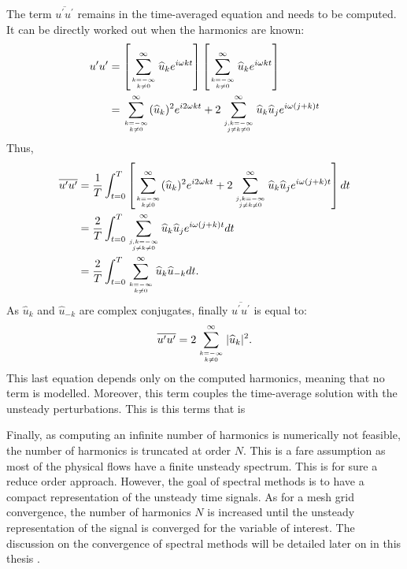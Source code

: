 The term $\overline{u^\prime u^\prime}$ remains in the time-averaged
equation and needs to be computed. It can be 
directly worked out when the harmonics are known:
\begin{equation}
	\begin{split}
		u^\prime u^\prime &= 
		\left[
			\sum_{k=-\infty \atop k \neq 0}^{\infty} \widehat{u}_k e^{i \omega k t} 
		\right]
		\left[
			\sum_{k=-\infty \atop k \neq 0}^{\infty} \widehat{u}_k e^{i \omega k t} 
		\right] \\
		&= \sum_{k=-\infty \atop k \neq 0}^{\infty} (\widehat{u}_k)^2
		   e^{i 2 \omega k t} +
		   2 \sum_{j,k=-\infty \atop j \neq k \neq 0}^{\infty} 
		   \widehat{u}_k \widehat{u}_j e^{i \omega (j + k) t} \\
	\end{split}
\end{equation}
Thus,
\begin{equation}
	\begin{split}
		\overline{u^\prime u^\prime} &= 
		\frac{1}{T} \int_{t=0}^{T} \left[ 
			\sum_{k=-\infty \atop k \neq 0}^{\infty} (\widehat{u}_k)^2
		   	e^{i 2 \omega k t} +
		   	2 \sum_{j,k=-\infty \atop j \neq k \neq 0}^{\infty} 
		   	\widehat{u}_k \widehat{u}_j e^{i \omega (j + k) t} 
		\right] dt\\
		&= \frac{2}{T} \int_{t=0}^{T} \sum_{j,k=-\infty \atop j \neq k \neq 0}^{\infty} 
		   	\widehat{u}_k \widehat{u}_j 
		   	e^{i \omega (j + k) t} dt \\
		&= \frac{2}{T} \int_{t=0}^{T} 
			\sum_{k=-\infty \atop k \neq 0}^{\infty} 
			\widehat{u}_k \widehat{u}_{-k}  dt.
	\end{split}
\end{equation}
As $\widehat{u}_k$ and $\widehat{u}_{-k}$ are complex conjugates,
finally $\overline{u^\prime u^\prime}$ is equal to:
\begin{equation}
	\overline{u^\prime u^\prime} = 
	2 \sum_{k=-\infty \atop k \neq 0}^{\infty} |\widehat{u}_k|^2.
	\label{eq:sm_nlh_deterministic_stress_terms}
\end{equation}
This last equation depends only on the computed harmonics, meaning
that no term is modelled. Moreover, this term couples the
time-average solution with the unsteady perturbations. This is this
terms that is 

Finally, as computing an infinite number of harmonics is 
numerically not feasible,
the number of harmonics is truncated at order $N$. 
This is a fare assumption as most
of the physical flows have a finite unsteady spectrum. This
is for sure a reduce order approach. However, the goal of spectral
methods is to have a compact representation of the unsteady time
signals. As for a mesh grid convergence, the number of harmonics $N$
is increased until the unsteady representation of the signal is
converged for the variable of interest. The discussion on the
convergence of spectral methods will be detailed later on in this 
thesis .

